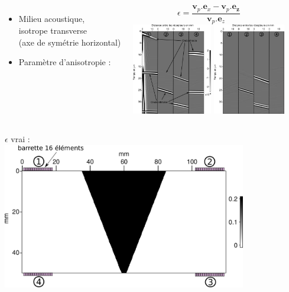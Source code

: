 \documentclass[10pt,xcolor=x11names,compress, notes=show]{beamer}%
\begin{document}
\subsection*{}
\begin{frame}{\insertsectionhead}
	\begin{columns}
		\centering
		\centering
		\begin{itemize}
			\item  Milieu acoustique,\\ isotrope transverse\\ (axe de symétrie horizontal)\\[0.3cm]
			\item Paramètre d'anisotropie :
		\end{itemize}			 
		\begin{equation*}
			\epsilon = \frac{\bm{v}_{p}.\bm{e}_{x}-\bm{v}_{p}.\bm{e_{z}}}{\bm{v}_{p}.\bm{e}_{z}}
		\end{equation*}
		\hspace{-0.5cm}\includegraphics[height=4cm]{img/anisotrope/e20.png}
		\hspace{-0.3cm}\includegraphics[height=4cm]{img/anisotrope/residu_init.png}
	\end{columns}	
	\vspace{0.6cm}
	\begin{columns}
		\column{0.5\textwidth}
		\centering
		$\epsilon$ vrai : \\[0.2cm]
		\includegraphics[width=0.8\textwidth]{img/anisotrope/epsilon_true.png}\\
		

\end{columns}
\end{frame}
\end{document}
